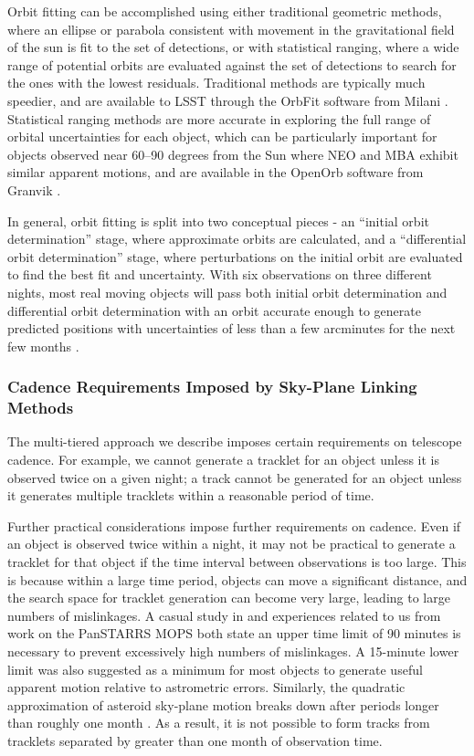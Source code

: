 \documentclass[12pt,preprint]{aastex}
\begin{document}
Orbit fitting can be accomplished using either traditional geometric
methods, where an ellipse or parabola consistent with movement in the
gravitational field of the sun is fit to the set of detections, or
with statistical ranging, where a wide range of potential orbits are
evaluated against the set of detections to search for the ones with
the lowest residuals. Traditional methods are typically much speedier,
and are available to LSST through the OrbFit software from Milani
\citep{Milani2006}. Statistical ranging methods are more accurate in
exploring the full range of orbital uncertainties for each object,
which can be particularly important for objects observed near 60--90
degrees from the Sun where NEO and MBA exhibit similar apparent
motions, and are available in the OpenOrb software from Granvik
\citep{OpenOrb2009}.

In general, orbit fitting is split into two conceptual pieces - an
``initial orbit determination'' stage, where approximate orbits are
calculated, and a ``differential orbit determination'' stage, where
perturbations on the initial orbit are evaluated to find the best fit
and uncertainty. With six observations on three different nights, most
real moving objects will pass both initial orbit determination and
differential orbit determination with an orbit accurate enough to
generate predicted positions with uncertainties of less than a few
arcminutes for the next few months \citep{basicSolarSystem}.



\subsubsection{Cadence Requirements Imposed by Sky-Plane Linking Methods}
\label{cadenceRequirements}
The multi-tiered approach we describe imposes certain requirements on
telescope cadence.  For example, we cannot generate a tracklet for an
object unless it is observed twice on a given night; a track cannot be
generated for an object unless it generates multiple tracklets within
a reasonable period of time.

Further practical considerations impose further requirements on
cadence. Even if an object is observed twice within a night, it may
not be practical to generate a tracklet for that object if the time
interval between observations is too large.  This is because within a
large time period, objects can move a significant distance, and the
search space for tracklet generation can become very large, leading to
large numbers of mislinkages.  A casual study in \citet{kubica_thesis}
and experiences related to us from work on the PanSTARRS MOPS both
state an upper time limit of 90 minutes is necessary to prevent
excessively high numbers of mislinkages. A 15-minute lower limit was
also suggested as a minimum for most objects to generate useful
apparent motion relative to astrometric errors. Similarly, the
quadratic approximation of asteroid sky-plane motion breaks down after
periods longer than roughly one month \citep{kubica_thesis}.  As a
result, it is not possible to form tracks from tracklets separated by
greater than one month of observation time.
\end{document}
